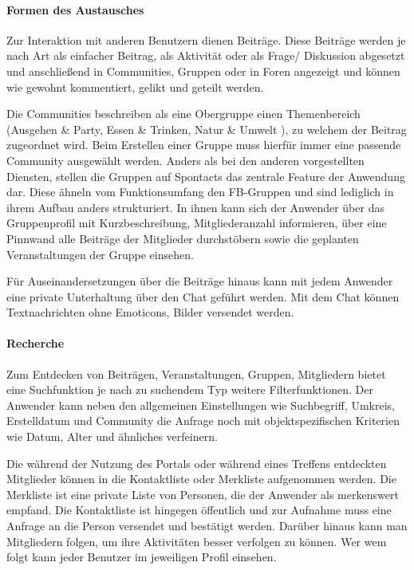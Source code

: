 \paragraph{Formen des Austausches}

Zur Interaktion mit anderen Benutzern dienen Beiträge. Diese Beiträge werden je nach Art als einfacher Beitrag, als Aktivität oder als Frage/ Diskussion abgesetzt und anschließend in Communities, Gruppen oder \ggf in Foren angezeigt und können wie gewohnt kommentiert, gelikt und geteilt werden.

Die Communities beschreiben als eine Obergruppe einen Themenbereich (Ausgehen \& Party, Essen \& Trinken, Natur \& Umwelt \usw), zu welchem der Beitrag zugeordnet wird. Beim Erstellen einer Gruppe muss hierfür immer eine passende Community ausgewählt werden.
Anders als bei den anderen vorgestellten Diensten, stellen die Gruppen auf Spontacts das zentrale Feature der Anwendung dar. Diese ähneln vom Funktionsumfang den FB-Gruppen und sind lediglich in ihrem Aufbau anders strukturiert. In ihnen kann sich der Anwender über das Gruppenprofil mit Kurzbeschreibung, Mitgliederanzahl \usw informieren, über eine Pinnwand alle Beiträge der Mitglieder durchstöbern sowie die geplanten Veranstaltungen der Gruppe einsehen.

Für Auseinandersetzungen über die Beiträge hinaus kann mit jedem Anwender eine private Unterhaltung über den Chat geführt werden. Mit dem Chat können Textnachrichten ohne Emoticons, Bilder \etc versendet werden.

\paragraph{Recherche}

Zum Entdecken von Beiträgen, Veranstaltungen, Gruppen, Mitgliedern \uvm bietet eine Suchfunktion je nach zu suchendem Typ weitere Filterfunktionen. Der Anwender kann neben den allgemeinen Einstellungen wie Suchbegriff, Umkreis, Erstelldatum und Community die Anfrage noch mit objektspezifischen Kriterien wie Datum, Alter und ähnliches verfeinern.

Die während der Nutzung des Portals oder während eines Treffens entdeckten Mitglieder können in die Kontaktliste oder Merkliste aufgenommen werden. Die Merkliste ist eine private Liste von Personen, die der Anwender als merkenswert empfand. Die Kontaktliste ist hingegen öffentlich und zur Aufnahme muss eine Anfrage an die Person versendet und bestätigt werden.
Darüber hinaus kann man Mitgliedern folgen, um ihre Aktivitäten besser verfolgen zu können. Wer wem folgt kann jeder Benutzer im jeweiligen Profil einsehen.

